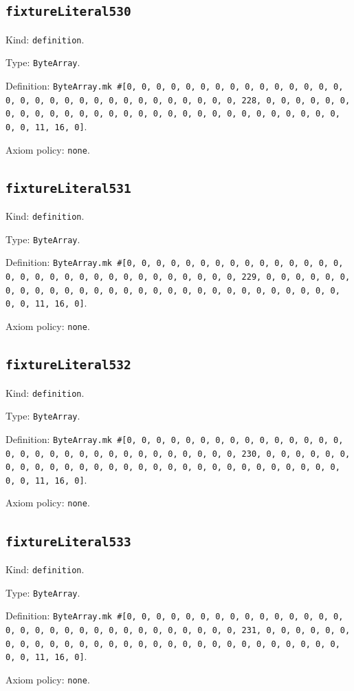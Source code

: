 \documentclass[11pt]{article}
\begin{document}
\subsection*{\texttt{fixtureLiteral530}}
\noindent Kind: \texttt{definition}.\par
\noindent Type: \texttt{ByteArray}.\par
\noindent Definition: \texttt{ByteArray.mk \#[0, 0, 0, 0, 0, 0, 0, 0, 0, 0, 0, 0, 0, 0, 0, 0, 0, 0, 0, 0, 0, 0, 0, 0, 0, 0, 0, 0, 0, 0, 0, 228, 0, 0, 0, 0, 0, 0, 0, 0, 0, 0, 0, 0, 0, 0, 0, 0, 0, 0, 0, 0, 0, 0, 0, 0, 0, 0, 0, 0, 0, 0, 0, 11, 16, 0]}.\par
\noindent Axiom policy: \texttt{none}.\par
\subsection*{\texttt{fixtureLiteral531}}
\noindent Kind: \texttt{definition}.\par
\noindent Type: \texttt{ByteArray}.\par
\noindent Definition: \texttt{ByteArray.mk \#[0, 0, 0, 0, 0, 0, 0, 0, 0, 0, 0, 0, 0, 0, 0, 0, 0, 0, 0, 0, 0, 0, 0, 0, 0, 0, 0, 0, 0, 0, 0, 229, 0, 0, 0, 0, 0, 0, 0, 0, 0, 0, 0, 0, 0, 0, 0, 0, 0, 0, 0, 0, 0, 0, 0, 0, 0, 0, 0, 0, 0, 0, 0, 11, 16, 0]}.\par
\noindent Axiom policy: \texttt{none}.\par
\subsection*{\texttt{fixtureLiteral532}}
\noindent Kind: \texttt{definition}.\par
\noindent Type: \texttt{ByteArray}.\par
\noindent Definition: \texttt{ByteArray.mk \#[0, 0, 0, 0, 0, 0, 0, 0, 0, 0, 0, 0, 0, 0, 0, 0, 0, 0, 0, 0, 0, 0, 0, 0, 0, 0, 0, 0, 0, 0, 0, 230, 0, 0, 0, 0, 0, 0, 0, 0, 0, 0, 0, 0, 0, 0, 0, 0, 0, 0, 0, 0, 0, 0, 0, 0, 0, 0, 0, 0, 0, 0, 0, 11, 16, 0]}.\par
\noindent Axiom policy: \texttt{none}.\par
\subsection*{\texttt{fixtureLiteral533}}
\noindent Kind: \texttt{definition}.\par
\noindent Type: \texttt{ByteArray}.\par
\noindent Definition: \texttt{ByteArray.mk \#[0, 0, 0, 0, 0, 0, 0, 0, 0, 0, 0, 0, 0, 0, 0, 0, 0, 0, 0, 0, 0, 0, 0, 0, 0, 0, 0, 0, 0, 0, 0, 231, 0, 0, 0, 0, 0, 0, 0, 0, 0, 0, 0, 0, 0, 0, 0, 0, 0, 0, 0, 0, 0, 0, 0, 0, 0, 0, 0, 0, 0, 0, 0, 11, 16, 0]}.\par
\noindent Axiom policy: \texttt{none}.\par
\end{document}
